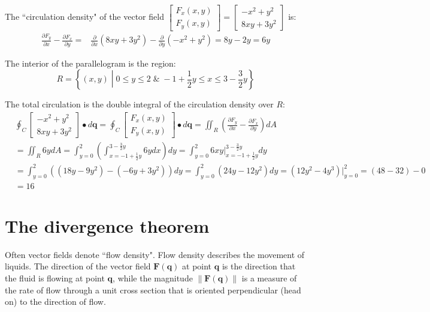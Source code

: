 \documentclass{article}
\begin{document}
\begin{itemize}
The ``circulation density" of the vector field \(\begin{bmatrix} F_x(x,y) \\ F_y(x,y) \end{bmatrix} = \begin{bmatrix} -x^2 + y^2 \\ 8xy + 3y^2 \end{bmatrix}\) is: 
\begin{align*}
\frac{\partial F_y}{\partial x} - \frac{\partial F_x}{\partial y} = & \frac{\partial}{\partial x}(8xy + 3y^2) - \frac{\partial}{\partial y}(-x^2 + y^2) = 8y - 2y = 6y 
\end{align*}

The interior of the parallelogram is the region:
\[R = \left\{(x,y) \middle| 0 \leq y \leq 2 \;\&\; -1 + \frac{1}{2}y \leq x \leq 3 - \frac{3}{2}y\right\}\] 

The total circulation is the double integral of the circulation density over \(R\):
\begin{align*}
& \oint_C \begin{bmatrix} -x^2 + y^2 \\ 8xy + 3y^2 \end{bmatrix} \bullet d\mathbf{q} 
= \oint_C \begin{bmatrix} F_x(x,y) \\ F_y(x,y) \end{bmatrix} \bullet d\mathbf{q} 
= \iint_R \left(\frac{\partial F_y}{\partial x} - \frac{\partial F_x}{\partial y}\right)dA \\ 
& = \iint_R 6y dA 
= \int_{y = 0}^2 \left(\int_{x = -1 + \frac{1}{2}y}^{3 - \frac{3}{2}y} 6y dx\right)dy 
= \int_{y = 0}^2 6xy\Big|_{x = -1 + \frac{1}{2}y}^{3 - \frac{3}{2}y} dy \\ 
& = \int_{y = 0}^2 ((18y - 9y^2) - (-6y + 3y^2))dy 
= \int_{y = 0}^2 (24y - 12y^2) dy 
= (12y^2 - 4y^3)\Big|_{y = 0}^2 
= (48 - 32) - 0 \\
& = 16
\end{align*}
\end{itemize}



\section*{The divergence theorem}

Often vector fields denote ``flow density". Flow density describes the movement of liquids. The direction of the vector field \(\mathbf{F}(\mathbf{q})\) at point \(\mathbf{q}\) is the direction that the fluid is flowing at point \(\mathbf{q}\), while the magnitude \(\|\mathbf{F}(\mathbf{q})\|\) is a measure of the rate of flow through a unit cross section that is oriented perpendicular (head on) to the direction of flow. 
\end{document}
